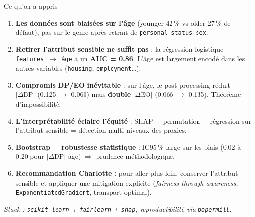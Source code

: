 \documentclass[aspectratio=169, 11pt]{beamer}
\begin{document}
\begin{frame}{Ce qu'on a appris}
\begin{enumerate}
    \item \textbf{Les donn\'ees sont biais\'ees sur l'\^age} (younger 42\,\% vs older 27\,\% de d\'efaut), pas sur le genre apr\`es retrait de \texttt{personal\_status\_sex}.

    \item \textbf{Retirer l'attribut sensible ne suffit pas} : la r\'egression logistique \texttt{features $\to$ \^age} a un \textbf{AUC = 0.86}. L'\^age est largement encod\'e dans les autres variables (\texttt{housing}, \texttt{employment}\ldots).

    \item \textbf{Compromis DP/EO in\'evitable} : sur l'\^age, le post-processing r\'eduit $|\Delta\text{DP}|$ (0.125 $\to$ 0.060) mais \textbf{double} $|\Delta\text{EO}|$ (0.066 $\to$ 0.135). Th\'eor\`eme d'impossibilit\'e.

    \item \textbf{L'interpr\'etabilit\'e \'eclaire l'\'equit\'e} : SHAP + permutation + r\'egression sur l'attribut sensible = d\'etection multi-niveaux des proxies.

    \item \textbf{Bootstrap = robustesse statistique} : IC95\,\% large sur les biais (0.02 \`a 0.20 pour $|\Delta\text{DP}|$ \^age) $\Rightarrow$ prudence m\'ethodologique.

    \item \textbf{Recommandation Charlotte :} pour aller plus loin, conserver l'attribut sensible et appliquer une mitigation explicite (\textit{fairness through awareness}, \texttt{ExponentiatedGradient}, transport optimal).
\end{enumerate}

\vspace{0.4em}
\centering\small
\textit{Stack : \texttt{scikit-learn} + \texttt{fairlearn} + \texttt{shap}, reproductibilit\'e via \texttt{papermill}.}
\end{frame}
\end{document}
